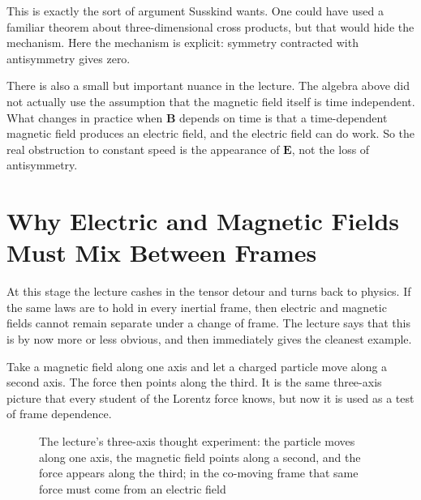 This is exactly the sort of argument Susskind wants. One could have used a familiar theorem about three-dimensional cross products, but that would hide the mechanism. Here the mechanism is explicit: symmetry contracted with antisymmetry gives zero.

There is also a small but important nuance in the lecture. The algebra above did not actually use the assumption that the magnetic field itself is time independent. What changes in practice when \(\mathbf B\) depends on time is that a time-dependent magnetic field produces an electric field, and the electric field can do work. So the real obstruction to constant speed is the appearance of \(\mathbf E\), not the loss of antisymmetry.

\section{Why Electric and Magnetic Fields Must Mix Between Frames}

At this stage the lecture cashes in the tensor detour and turns back to physics. If the same laws are to hold in every inertial frame, then electric and magnetic fields cannot remain separate under a change of frame. The lecture says that this is by now more or less obvious, and then immediately gives the cleanest example.

Take a magnetic field along one axis and let a charged particle move along a second axis. The force then points along the third. It is the same three-axis picture that every student of the Lorentz force knows, but now it is used as a test of frame dependence.

\begin{figure}
\centering
{}
\caption{The lecture's three-axis thought experiment: the particle moves along one axis, the magnetic field points along a second, and the force appears along the third; in the co-moving frame that same force must come from an electric field}
\end{figure}

